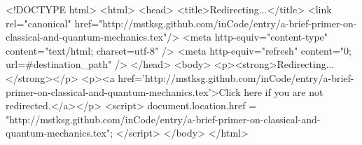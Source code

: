 <!DOCTYPE html>
<html>
<head>
<title>Redirecting...</title>
<link rel="canonical" href="http://mstksg.github.com/inCode/entry/a-brief-primer-on-classical-and-quantum-mechanics.tex"/>
<meta http-equiv="content-type" content="text/html; charset=utf-8" />
<meta http-equiv="refresh" content="0; url=#{destination_path}" />
</head>
<body>
  <p><strong>Redirecting...</strong></p>
  <p><a href='http://mstksg.github.com/inCode/entry/a-brief-primer-on-classical-and-quantum-mechanics.tex'>Click here if you are not redirected.</a></p>
  <script>
    document.location.href = "http://mstksg.github.com/inCode/entry/a-brief-primer-on-classical-and-quantum-mechanics.tex";
  </script>
</body>
</html>
